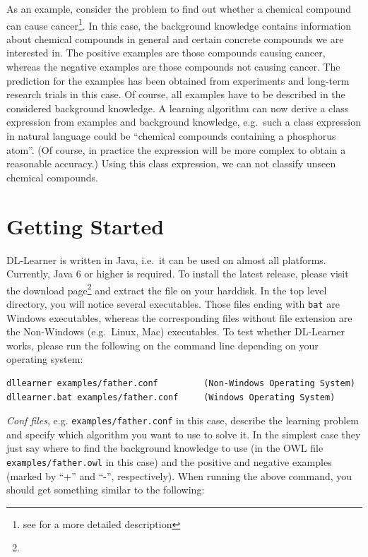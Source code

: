 \documentclass[a4paper,12pt]{scrartcl}
\begin{document}
As an example, consider the problem to find out whether a chemical compound can cause cancer\footnote{see \carc{} for a more detailed description}. In this case, the background knowledge contains information about chemical compounds in general and certain concrete compounds we are interested in. The positive examples are those compounds causing cancer, whereas the negative examples are those compounds not causing cancer. The prediction for the examples has been obtained from experiments and long-term research trials in this case. Of course, all examples have to be described in the considered background knowledge. A learning algorithm can now derive a class expression from examples and background knowledge, e.g.~such a class expression in natural language could be ``chemical compounds containing a phosphorus atom''. (Of course, in practice the expression will be more complex to obtain a reasonable accuracy.) Using this class expression, we can not classify unseen chemical compounds.

\section{Getting Started}
\label{sec:start}

DL-Learner is written in Java, i.e.~it can be used on almost all platforms. Currently, Java 6 or higher is required. To install the latest release, please visit the download page\footnote{\dldownload} and extract the file on your harddisk. In the top level directory, you will notice several executables. Those files ending with \verb|bat| are Windows executables, whereas the corresponding files without file extension are the Non-Windows (e.g.~Linux, Mac) executables. To test whether DL-Learner works, please run the following on the command line depending on your operating system:

\begin{verbatim}
dllearner examples/father.conf         (Non-Windows Operating System)
dllearner.bat examples/father.conf     (Windows Operating System)
\end{verbatim}

\emph{Conf files}, e.g. \verb|examples/father.conf| in this case, describe the learning problem and specify which algorithm you want to use to solve it. In the simplest case they just say where to find the background knowledge to use (in the OWL file \verb|examples/father.owl| in this case) and the positive and negative examples (marked by ``+'' and ``-'', respectively). When running the above command, you should get something similar to the following:
\end{document}
